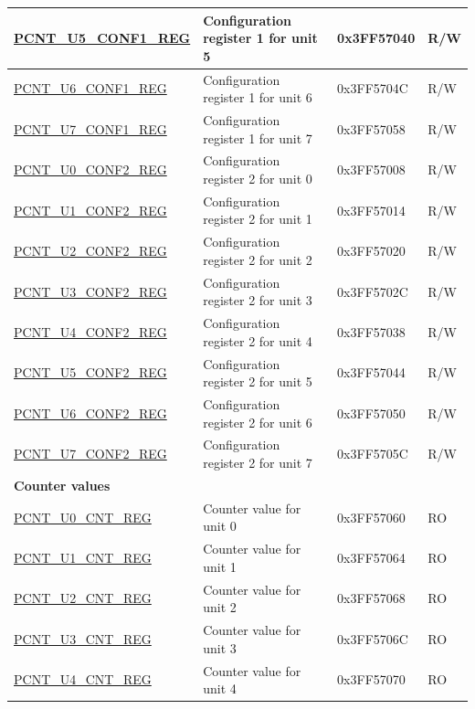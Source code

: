 \begin{longtable}{ | p{5cm} | p{7cm} | p{2cm} | p{1cm} | }
\hyperref[regdesc:PCNTUnCONF1REG]{PCNT\_U5\_CONF1\_REG} & Configuration register 1 for unit 5 & 0x3FF57040 & R/W \\ \hline
\hyperref[regdesc:PCNTUnCONF1REG]{PCNT\_U6\_CONF1\_REG} & Configuration register 1 for unit 6 & 0x3FF5704C & R/W \\ \hline
\hyperref[regdesc:PCNTUnCONF1REG]{PCNT\_U7\_CONF1\_REG} & Configuration register 1 for unit 7 & 0x3FF57058 & R/W \\ \hline
\hyperref[regdesc:PCNTUnCONF2REG]{PCNT\_U0\_CONF2\_REG} & Configuration register 2 for unit 0 & 0x3FF57008 & R/W \\ \hline
\hyperref[regdesc:PCNTUnCONF2REG]{PCNT\_U1\_CONF2\_REG} & Configuration register 2 for unit 1 & 0x3FF57014 & R/W \\ \hline
\hyperref[regdesc:PCNTUnCONF2REG]{PCNT\_U2\_CONF2\_REG} & Configuration register 2 for unit 2 & 0x3FF57020 & R/W \\ \hline
\hyperref[regdesc:PCNTUnCONF2REG]{PCNT\_U3\_CONF2\_REG} & Configuration register 2 for unit 3 & 0x3FF5702C & R/W \\ \hline
\hyperref[regdesc:PCNTUnCONF2REG]{PCNT\_U4\_CONF2\_REG} & Configuration register 2 for unit 4 & 0x3FF57038 & R/W \\ \hline
\hyperref[regdesc:PCNTUnCONF2REG]{PCNT\_U5\_CONF2\_REG} & Configuration register 2 for unit 5 & 0x3FF57044 & R/W \\ \hline
\hyperref[regdesc:PCNTUnCONF2REG]{PCNT\_U6\_CONF2\_REG} & Configuration register 2 for unit 6 & 0x3FF57050 & R/W \\ \hline
\hyperref[regdesc:PCNTUnCONF2REG]{PCNT\_U7\_CONF2\_REG} & Configuration register 2 for unit 7 & 0x3FF5705C & R/W \\ \hline
\multicolumn{4}{|l|}{\textbf{Counter values}} \\ \hline
\hyperref[regdesc:PCNTUnCNTREG]{PCNT\_U0\_CNT\_REG} & Counter value for unit 0 & 0x3FF57060 & RO \\ \hline
\hyperref[regdesc:PCNTUnCNTREG]{PCNT\_U1\_CNT\_REG} & Counter value for unit 1 & 0x3FF57064 & RO \\ \hline
\hyperref[regdesc:PCNTUnCNTREG]{PCNT\_U2\_CNT\_REG} & Counter value for unit 2 & 0x3FF57068 & RO \\ \hline
\hyperref[regdesc:PCNTUnCNTREG]{PCNT\_U3\_CNT\_REG} & Counter value for unit 3 & 0x3FF5706C & RO \\ \hline
\hyperref[regdesc:PCNTUnCNTREG]{PCNT\_U4\_CNT\_REG} & Counter value for unit 4 & 0x3FF57070 & RO \\ \hline

\end{longtable}
